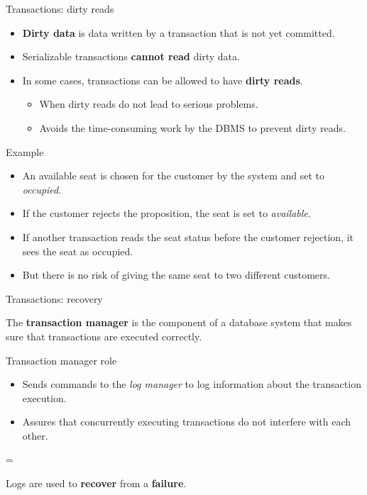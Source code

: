 \documentclass[xcolor=table]{beamer}
\newenvironment{warning}
  {\par\begin{mdframed}[linewidth=2pt,linecolor=darkred]%
    \begin{list}{}{\leftmargin=1cm
                   \labelwidth=\leftmargin}\item[\Large\ding{43}]}
  {\end{list}\end{mdframed}\par}
\begin{document}
  \begin{frame}{Transactions: dirty reads}
    \begin{itemize}
      \item {\bf Dirty data} is data written by a transaction 
      that is not yet committed.
      \item Serializable transactions {\bf cannot read} dirty data. 
      \item In some cases, transactions can be allowed to have {\bf dirty reads}.
      \begin{itemize}
        \item When dirty reads do not lead to serious problems.
        \item Avoids the time-consuming work by the DBMS to prevent 
        dirty reads.
      \end{itemize}
    \end{itemize}
    \vfill
    \begin{block}{Example}
      \begin{itemize}
        \item An available seat is chosen for the customer by the system and set to {\em occupied}.
        \item If the customer rejects the proposition, the seat is set to {\em available}.
        \item If another transaction reads the seat status before the customer rejection, 
        it sees the seat as occupied.
        \item But there is no risk of giving the same seat to two different customers.
      \end{itemize}
    \end{block}
  \end{frame}

  \begin{frame}{Transactions: recovery}
    \begin{definition}
      The {\bf transaction manager} is the component of a 
      database system that makes sure that transactions are executed 
      correctly.
    \end{definition}
    \vfill
    \begin{exampleblock}{Transaction manager role}
      \begin{itemize}
        \item Sends commands to the {\em log manager} to log 
        information about the transaction execution.
        \item Assures that concurrently executing transactions 
        do not interfere with each other.
      \end{itemize}
    \end{exampleblock}
    \begin{warning}
      Logs are used to {\bf recover} from a {\bf failure}.
    \end{warning}
  \end{frame}
  
\end{document}
